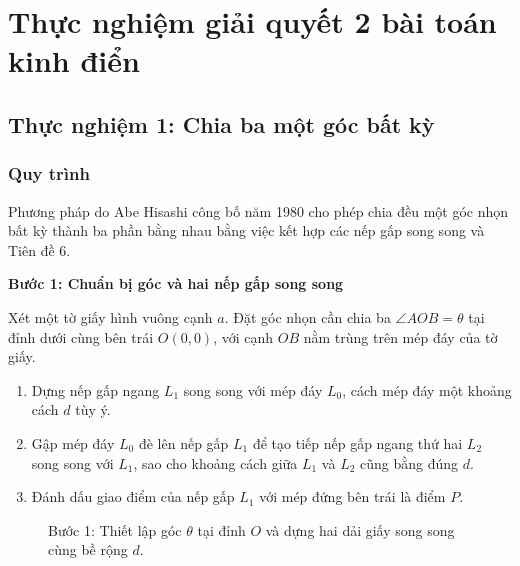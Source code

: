 \chapter{Thực nghiệm giải quyết 2 bài toán kinh điển}
\section{Thực nghiệm 1: Chia ba một góc bất kỳ}
\subsection{Quy trình}
Phương pháp do Abe Hisashi công bố năm 1980 cho phép chia đều một góc nhọn bất kỳ thành ba phần bằng nhau bằng việc kết hợp các nếp gấp song song và Tiên đề 6.

\textbf{Bước 1: Chuẩn bị góc và hai nếp gấp song song}

Xét một tờ giấy hình vuông cạnh $a$. Đặt góc nhọn cần chia ba $\angle AOB = \theta$ tại đỉnh dưới cùng bên trái $O(0,0)$, với cạnh $OB$ nằm trùng trên mép đáy của tờ giấy.

\begin{enumerate}
    \item Dựng nếp gấp ngang $L_1$ song song với mép đáy $L_0$, cách mép đáy một khoảng cách $d$ tùy ý.
    \item Gập mép đáy $L_0$ đè lên nếp gấp $L_1$ để tạo tiếp nếp gấp ngang thứ hai $L_2$ song song với $L_1$, sao cho khoảng cách giữa $L_1$ và $L_2$ cũng bằng đúng $d$.
    \item Đánh dấu giao điểm của nếp gấp $L_1$ với mép đứng bên trái là điểm $P$.
\end{enumerate}

\begin{figure}[H]
    \centering
    \caption{Bước 1: Thiết lập góc $\theta$ tại đỉnh $O$ và dựng hai dải giấy song song cùng bề rộng $d$.}
    \label{fig:abe_step1}
\end{figure}

